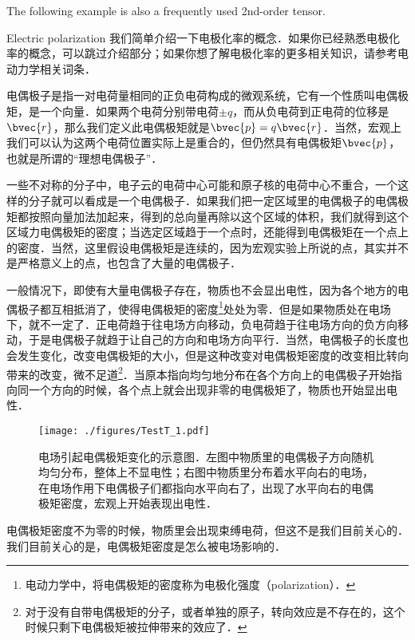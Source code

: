 The following example is also a frequently used 2nd-order tensor. 

\begin{example}{Electric polarization}
我们简单介绍一下电极化率的概念．如果你已经熟悉电极化率的概念，可以跳过介绍部分；如果你想了解电极化率的更多相关知识，请参考电动力学相关词条．

电偶极子是指一对电荷量相同的正负电荷构成的微观系统，它有一个性质叫电偶极矩，是一个向量．如果两个电荷分别带电荷$\pm q$，而从负电荷到正电荷的位移是$\bvec{r}$，那么我们定义此电偶极矩就是$\bvec{p}=q\bvec{r}$．当然，宏观上我们可以认为这两个电荷位置实际上是重合的，但仍然具有电偶极矩$\bvec{p}$，也就是所谓的“理想电偶极子”．

一些不对称的分子中，电子云的电荷中心可能和原子核的电荷中心不重合，一个这样的分子就可以看成是一个电偶极子．如果我们把一定区域里的电偶极子的电偶极矩都按照向量加法加起来，得到的总向量再除以这个区域的体积，我们就得到这个区域力电偶极矩的密度；当选定区域趋于一个点时，还能得到电偶极矩在一个点上的密度．当然，这里假设电偶极矩是连续的，因为宏观实验上所说的点，其实并不是严格意义上的点，也包含了大量的电偶极子．

一般情况下，即使有大量电偶极子存在，物质也不会显出电性，因为各个地方的电偶极子都互相抵消了，使得电偶极矩的密度\footnote{电动力学中，将电偶极矩的密度称为电极化强度（polarization）．}处处为零．但是如果物质处在电场下，就不一定了．正电荷趋于往电场方向移动，负电荷趋于往电场方向的负方向移动，于是电偶极子就趋于让自己的方向和电场方向平行．当然，电偶极子的长度也会发生变化，改变电偶极矩的大小，但是这种改变对电偶极矩密度的改变相比转向带来的改变，微不足道\footnote{对于没有自带电偶极矩的分子，或者单独的原子，转向效应是不存在的，这个时候只剩下电偶极矩被拉伸带来的效应了．}．当原本指向均匀地分布在各个方向上的电偶极子开始指向同一个方向的时候，各个点上就会出现非零的电偶极矩了，物质也开始显出电性．




\begin{figure}[ht]
\centering
\texttt{[image: ./figures/TestT\_1.pdf]}
\caption{电场引起电偶极矩变化的示意图．左图中物质里的电偶极子方向随机均匀分布，整体上不显电性；右图中物质里分布着水平向右的电场，在电场作用下电偶极子们都指向水平向右了，出现了水平向右的电偶极矩密度，宏观上开始表现出电性．} \label{TestT_fig1}
\end{figure}




电偶极矩密度不为零的时候，物质里会出现束缚电荷，但这不是我们目前关心的．我们目前关心的是，电偶极矩密度是怎么被电场影响的．


\end{example}

